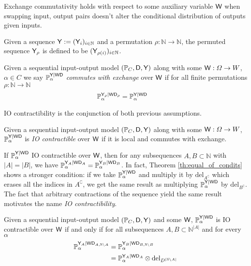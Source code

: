 Exchange commutativity holds with respect to some auxiliary variable $\mathsf{W}$ when swapping input, output pairs doesn't alter the conditional distribution of outputs given inputs. 

\begin{notation}
Given a sequence $\mathsf{Y}:=(\mathsf{Y}_i)_{i\in \mathbb{N}}$ and a permutation $\rho:\mathbb{N}\to\mathbb{N}$, the permuted sequence $\mathsf{Y}_{\rho}$ is defined to be $(\mathsf{Y}_{\rho(i)})_{i\in\mathbb{N}}$.
\end{notation}

\begin{definition}\label{def:caus_exch}
Given a sequential input-output model $(\mathbb{P}_C,\mathsf{D},\mathsf{Y})$ along with some $\mathsf{W}:\Omega\to W$, $\alpha\in C$ we say $\mathbb{P}_\alpha^{\mathsf{Y}|\mathsf{WD}}$ \emph{commutes with exchange} over $\mathsf{W}$ if for all finite permutations $\rho:\mathbb{N}\to\mathbb{N}$
\begin{align}
    \mathbb{P}_\alpha^{\mathsf{Y}_\rho|\mathsf{WD}_\rho} &=  \mathbb{P}_\alpha^{\mathsf{Y}|\mathsf{WD}}
\end{align}
\end{definition}

IO contractibility is the conjunction of both previous assumptions.

\begin{definition}[IO contractibility]\label{def:ccontract}
Given a sequential input-output model $(\mathbb{P}_C,\mathsf{D},\mathsf{Y})$ along with some $\mathsf{W}:\Omega\to W$, $\mathbb{P}_\alpha^{\mathsf{Y}|\mathsf{WD}}$ is \emph{IO contractible} over $\mathsf{W}$ if it is local and commutes with exchange.
\end{definition}

If $\mathbb{P}_\alpha^{\mathsf{Y}|\mathsf{WD}}$ IO contractible over $\mathsf{W}$, then for any subsequences $A,B\subset\mathbb{N}$ with $|A|=|B|$, we have $\mathbb{P}_\alpha^{\mathsf{Y}_A|\mathsf{WD}_A}=\mathbb{P}_\alpha^{\mathsf{Y}_B|\mathsf{WD}_B}$. In fact, Theorem \ref{th:equal_of_condits} shows a stronger condition: if we take $\mathbb{P}_\alpha^{\mathsf{Y}|\mathsf{WD}}$ and multiply it by $\mathrm{del}_{A^{\complement}}$ which erases all the indices in $A^{\complement}$, we get the same result as multiplying $\mathbb{P}_\alpha^{\mathsf{Y}|\mathsf{WD}}$ by $\mathrm{del}_{B^{\complement}}$. The fact that arbitrary contractions of the sequence yield the same result motivates the name \emph{IO contractibility}. 

\begin{theorem}\label{th:equal_of_condits}
Given a sequential input-output model $(\mathbb{P}_C,\mathsf{D},\mathsf{Y})$ and some $\mathsf{W}$, $\mathbb{P}_\alpha^{\mathsf{Y}|\mathsf{WD}}$ is IO contractible over $\mathsf{W}$ if and only if for all subsequences $A,B\subset \mathbb{N}^{|A|}$ and for every $\alpha$
\begin{align}
    \mathbb{P}_\alpha^{\mathsf{Y}_A|\mathsf{WD}_{A,\mathbb{N}\setminus A}} &= \mathbb{P}_\alpha^{\mathsf{Y}_B|\mathsf{WD}_{B,\mathbb{N}\setminus B}}\\
    &= \mathbb{P}_\alpha^{\mathsf{Y}_A|\mathsf{WD}_A}\otimes \mathrm{del}_{D^{|\mathbb{N}\setminus A|}}
\end{align}
\end{theorem}

